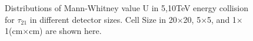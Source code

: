 \documentclass[final,1p,11pt]{elsarticle}
\begin{document}
\begin{figure}
\begin{center}
{   }

\end{center}
\caption{Distributions of Mann-Whitney value U in 5,10TeV energy collision for $\tau_{21}$ in different detector sizes. Cell Size in 20$\times$20, 5$\times$5, and 1$\times$1(cm$\times$cm) are shown here.}
\label{fig:cluster_tau21_tau32}
\end{figure}
\end{document}
